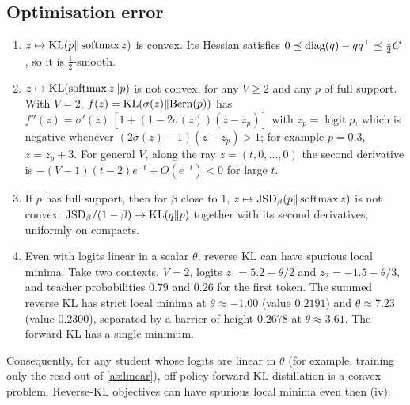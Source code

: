 \subsection{Optimisation error}\label{sec:optimisation}

\begin{proposition}\label{prop:convexity}
\Pv\Ck
\begin{enumerate}[label=(\roman*),nosep]
\item $z\mapsto\mathrm{KL}(p\|\operatorname{softmax} z)$ is convex. Its Hessian satisfies
$0\preceq\operatorname{diag}(q)-qq^\top\preceq\frac12C$ \citep{bohning1992multinomial}, so it is $\frac12$-smooth.
\item $z\mapsto\mathrm{KL}(\operatorname{softmax} z\|p)$ is not convex, for any $V\ge2$ and any $p$ of full support. With $V=2$,
$f(z)=\mathrm{KL}(\sigma(z)\|\mathrm{Bern}(p))$ has $f''(z)=\sigma'(z)\,[1+(1-2\sigma(z))(z-z_p)]$ with $z_p=\operatorname{logit}p$, which is
negative whenever $(2\sigma(z)-1)(z-z_p)>1$; for example $p=0.3$, $z=z_p+3$. For general $V$, along the ray
$z=(t,0,\dots,0)$ the second derivative is $-(V-1)(t-2)e^{-t}+O(e^{-t})<0$ for large $t$.
\item If $p$ has full support, then for $\beta$ close to $1$, $z\mapsto\mathrm{JSD}_\beta(p\|\operatorname{softmax} z)$ is not convex:
$\mathrm{JSD}_\beta/(1-\beta)\to\mathrm{KL}(q\|p)$ together with its second derivatives, uniformly on compacts.
\item Even with logits linear in a scalar $\theta$, reverse KL can have spurious local minima. Take two
contexts, $V=2$, logits $z_1=5.2-\theta/2$ and $z_2=-1.5-\theta/3$, and teacher probabilities $0.79$ and $0.26$ for the
first token. The summed reverse KL has strict local minima at $\theta\approx-1.00$ (value $0.2191$) and
$\theta\approx7.23$ (value $0.2300$), separated by a barrier of height $0.2678$ at $\theta\approx3.61$. The forward KL has a
single minimum.
\end{enumerate}
Consequently, for any student whose logits are linear in $\theta$ (for example, training only the
read-out of \cref{as:linear}), off-policy forward-KL distillation is a convex problem. Reverse-KL
objectives can have spurious local minima even then (iv).
\end{proposition}
